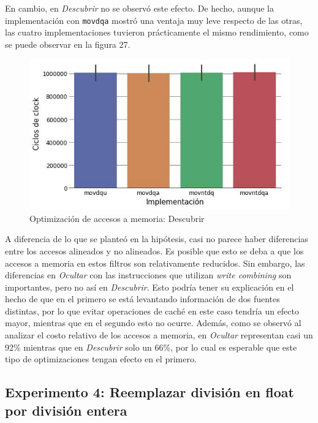 \documentclass[a4paper]{article}
\begin{document}
En cambio, en \textit{Descubrir} no se observó este efecto. De hecho, aunque la implementación con {\tt movdqa} mostró una ventaja muy leve respecto de las otras, las cuatro implementaciones tuvieron prácticamente el mismo rendimiento, como se puede observar en la figura 27.

\begin{figure}[!htb]
  \begin{center}
	\includegraphics[scale=0.6]{img/exp3descubrir.jpg}
	\caption{Optimización de accesos a memoria: Descubrir}
  \end{center}
\end{figure}

A diferencia de lo que se planteó en la hipótesis, casi no parece haber diferencias entre los accesos alineados y no alineados. Es posible que esto se deba a que los accesos a memoria en estos filtros son relativamente reducidos. Sin embargo, las diferencias en \textit{Ocultar} con las instrucciones que utilizan \textit{write combining} son importantes, pero no así en \textit{Descubrir}. Esto podría tener su explicación en el hecho de que en el primero se está levantando información de dos fuentes distintas, por lo que evitar operaciones de caché en este caso tendría un efecto mayor, mientras que en el segundo esto no ocurre. Además, como se observó al analizar el costo relativo de los accesos a memoria, en \textit{Ocultar} representan casi un 92\% mientras que en \textit{Descubrir} solo un 66\%, por lo cual es esperable que este tipo de optimizaciones tengan efecto en el primero.

\subsection{Experimento 4: Reemplazar división en float por división entera}
\end{document}
